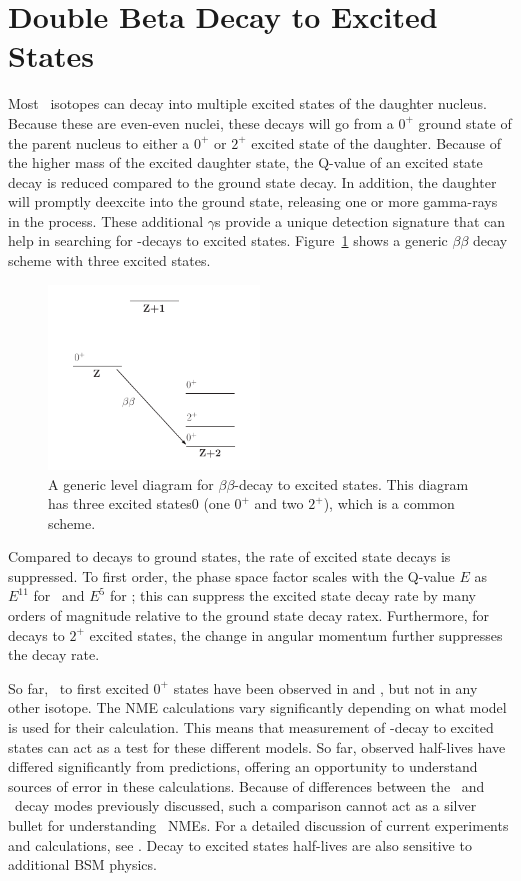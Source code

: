 \documentclass[/main.tex]{subfiles}
\begin{document}
\section{Double Beta Decay to Excited States}
Most \bb\ isotopes can decay into multiple excited states of the daughter nucleus.
Because these are even-even nuclei, these decays will go from a $0^+$ ground state of the parent nucleus to either a $0^+$ or $2^+$ excited state of the daughter.
Because of the higher mass of the excited daughter state, the Q-value of an excited state decay is reduced compared to the ground state decay.
In addition, the daughter will promptly deexcite into the ground state, releasing one or more gamma-rays in the process.
These additional $\gamma$s provide a unique detection signature that can help in searching for \bb-decays to excited states.
Figure~\ref{fig:bbeslevelgeneric} shows a generic $\beta\beta$ decay scheme with three excited states.
\begin{figure}[t]
  \centering
  \includegraphics[width=0.5\textwidth]{bbesdecayscheme}
  \caption[Generic $\beta\beta$ to Excited States Level Diagram]{\label{fig:bbeslevelgeneric}
    A generic level diagram for $\beta\beta$-decay to excited states. This diagram has three excited states0 (one $0^+$ and two $2^+$), which is a common scheme.
  }
\end{figure}

Compared to decays to ground states, the rate of excited state decays is suppressed.
To first order, the phase space factor scales with the Q-value $E$ as $E^{11}$ for \tnbb\ and $E^5$ for \znbb; this can suppress the excited state decay rate by many orders of magnitude relative to the ground state decay ratex.
Furthermore, for decays to $2^+$ excited states, the change in angular momentum further suppresses the decay rate.

So far, \tnbb\ to first excited $0^+$ states have been observed in  and , but not in any other isotope.
The NME calculations vary significantly depending on what model is used for their calculation.
This means that measurement of \bb -decay to excited states can act as a test for these different models.
So far, observed half-lives have differed significantly from predictions, offering an opportunity to understand sources of error in these calculations.
Because of differences between the \tnbb\ and \znbb\ decay modes previously discussed, such a comparison cannot act as a silver bullet for understanding \znbb\ NMEs.
For a detailed discussion of current experiments and calculations, see \cite{barabash2017}.
Decay to excited states half-lives are also sensitive to additional BSM physics.
\end{document}
